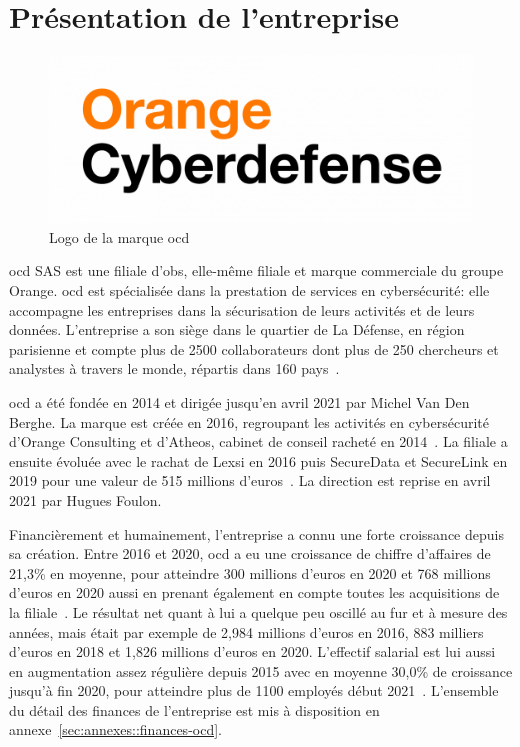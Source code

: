 \documentclass[12pt, oneside, a4paper, titlepage]{report}
\begin{document}
\section{Présentation de l'entreprise}%
\label{sec:intro::entreprise}

\begin{figure}[h!]
    \centering
    \includegraphics[width = 0.8\linewidth]{img/logo/ocd.png}
    \caption{Logo de la marque \acrlong{ocd}}%
    \label{fig:logo/ocd}
\end{figure}

\Gls{ocd} SAS est une filiale d'\gls{obs}, elle-même filiale et marque
commerciale du groupe Orange. \gls{ocd} est spécialisée dans la prestation de
services en cybersécurité: elle accompagne les entreprises dans la sécurisation
de leurs activités et de leurs données. L'entreprise a son siège dans le
quartier de La Défense, en région parisienne et compte plus de 2500
collaborateurs dont plus de 250 chercheurs et analystes à travers le monde,
répartis dans 160 pays~\cite{ocd}.

\acrlong{ocd} a été fondée en 2014 et dirigée jusqu'en avril 2021 par Michel Van
Den Berghe. La marque est créée en 2016, regroupant les activités en
cybersécurité d'Orange Consulting et d'Atheos, cabinet de conseil racheté en
2014~\cite{rachat-atheos}.  La filiale a ensuite évoluée avec le rachat de Lexsi
en 2016 puis SecureData et SecureLink en 2019 pour une valeur de 515 millions
d'euros~\cite{rachat-securelink}. La direction est reprise en avril 2021 par
Hugues Foulon.

Financièrement et humainement, l'entreprise a connu une forte croissance depuis
sa création. Entre 2016 et 2020, \gls{ocd} a eu une croissance de chiffre
d'affaires de 21,3\% en moyenne, pour atteindre 300 millions d'euros en 2020 et
768 millions d'euros en 2020 aussi en prenant également en compte toutes les
acquisitions de la filiale~\cite{ocd}. Le résultat net quant à lui a quelque peu
oscillé au fur et à mesure des années, mais était par exemple de 2,984 millions
d'euros en 2016, 883 milliers d'euros en 2018 et 1,826 millions d'euros en 2020.
L'effectif salarial est lui aussi en augmentation assez régulière depuis 2015
avec en moyenne 30,0\% de croissance jusqu'à fin 2020, pour atteindre plus de
1100 employés début 2021~\cite{finances-ocd}. L'ensemble du détail des finances
de l'entreprise est mis à disposition en annexe~\ref{sec:annexes::finances-ocd}.
\end{document}

